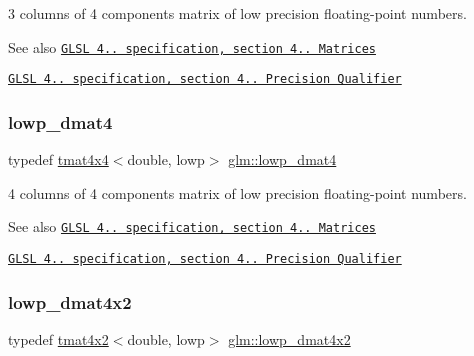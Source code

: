 3 columns of 4 components matrix of low precision floating-\/point numbers.

\begin{DoxySeeAlso}{See also}
\href{http://www.opengl.org/registry/doc/GLSLangSpec.4.20.8.pdf}{\tt G\+L\+SL 4.. specification, section 4.. Matrices} 

\href{http://www.opengl.org/registry/doc/GLSLangSpec.4.20.8.pdf}{\tt G\+L\+SL 4.. specification, section 4.. Precision Qualifier} 
\end{DoxySeeAlso}
\mbox{\label{group__core__precision_gafb95042ba1765add225ae138437f860e}} 
\subsubsection{\texorpdfstring{lowp\+\_\+dmat4}{lowp\_dmat4}}
{\footnotesize\ttfamily typedef \hyperlink{structglm_1_1tmat4x4}{tmat4x4}$<$double, lowp$>$ \hyperlink{group__core__precision_gafb95042ba1765add225ae138437f860e}{glm\+::lowp\+\_\+dmat4}}

4 columns of 4 components matrix of low precision floating-\/point numbers.

\begin{DoxySeeAlso}{See also}
\href{http://www.opengl.org/registry/doc/GLSLangSpec.4.20.8.pdf}{\tt G\+L\+SL 4.. specification, section 4.. Matrices} 

\href{http://www.opengl.org/registry/doc/GLSLangSpec.4.20.8.pdf}{\tt G\+L\+SL 4.. specification, section 4.. Precision Qualifier} 
\end{DoxySeeAlso}
\mbox{\label{group__core__precision_gaeee03c38861981ecb29f3f71644bf3ac}} 
\subsubsection{\texorpdfstring{lowp\+\_\+dmat4x2}{lowp\_dmat4x2}}
{\footnotesize\ttfamily typedef \hyperlink{structglm_1_1tmat4x2}{tmat4x2}$<$double, lowp$>$ \hyperlink{group__core__precision_gaeee03c38861981ecb29f3f71644bf3ac}{glm\+::lowp\+\_\+dmat4x2}}

